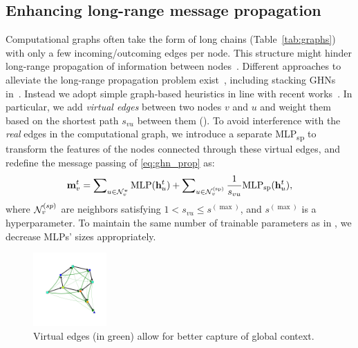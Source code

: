 \subsection{Enhancing long-range message propagation\label{sec:sp_edges}}

Computational graphs often take the form of long chains (Table~\ref{tab:graphs}) with only a few incoming/outcoming edges per node. This structure might hinder long-range propagation of information between nodes~\citep{alon2020bottleneck}.	
Different approaches to alleviate the long-range propagation problem exist~\citep{el1996hierarchical,liu2020non,pei2020geom}, including stacking GHNs in~\citep{zhang2018graph}.
Instead we adopt simple graph-based heuristics in line with recent works~\citep{you2019position,yang2021spagan}. In particular, we add \emph{virtual edges} between two nodes $v$ and $u$ and weight them based on the shortest path $s_{vu}$ between them (\fig{\ref{fig:long_range}}). To avoid interference with the \emph{real} edges in the computational graph, we introduce a separate MLP\textsubscript{sp} to transform the features of the nodes connected through these virtual edges, and redefine the message passing of \eqref{eq:ghn_prop} as:
%
\begin{equation}
\label{eq:ghn_sp}
\mathbf{m}_v^t = \sum\nolimits_{u \in \mathcal{N}_v^{\pi}} \text{MLP}(\mathbf{h}_u^t) + \sum\nolimits_{u \in \mathcal{N}_{v}^{(\text{sp})}} \frac{1}{s_{vu}} \text{MLP}_{\text{sp}}(\mathbf{h}_u^t),
\end{equation}
%
\noindent where $\mathcal{N}_{v}^{(sp)}$ are neighbors satisfying $1 < s_{vu} \leq s^{(\max)}$, and $s^{(\max)}$ is a hyperparameter.
To maintain the same number of trainable parameters as in \ghnbase, we decrease MLPs' sizes appropriately. 

\begin{figure}[htbp]
\centering
\includegraphics[width=0.25\textwidth,align=c,trim={2.8cm 3cm 2.7cm 3cm}, clip]{dag_resnet_3_sp.png} 
\vspace{-5pt}
\caption{\small Virtual edges (in green) allow for better capture of global context.}\label{fig:long_range}
\end{figure}

